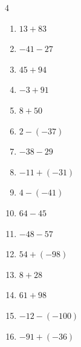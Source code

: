 \begin{multicols}{4}
\begin{enumerate}
        \phantom{$=-4$}

  \item $13+83$

        \phantom{$=96$}

  \item $-41-27$

        \phantom{$=-68$}

  \item $45+94$

        \phantom{$=139$}

  \item $-3+91$

        \phantom{$=88$}

  \item $8+50$

        \phantom{$=58$}

  \item $2-(-37)$

        \phantom{$=39$}

  \item $-38-29$

        \phantom{$=-67$}

  \item $-11+(-31)$

        \phantom{$=-42$}

  \item $4-(-41)$

        \phantom{$=45$}

  \item $64-45$

        \phantom{$=19$}

  \item $-48-57$

        \phantom{$=-105$}

  \item $54+(-98)$

        \phantom{$=-44$}

  \item $8+28$

        \phantom{$=36$}

  \item $61+98$

        \phantom{$=159$}

  \item $-12-(-100)$

        \phantom{$=88$}

\columnbreak %

  \item $-91+(-36)$


\end{enumerate}
\end{multicols}

